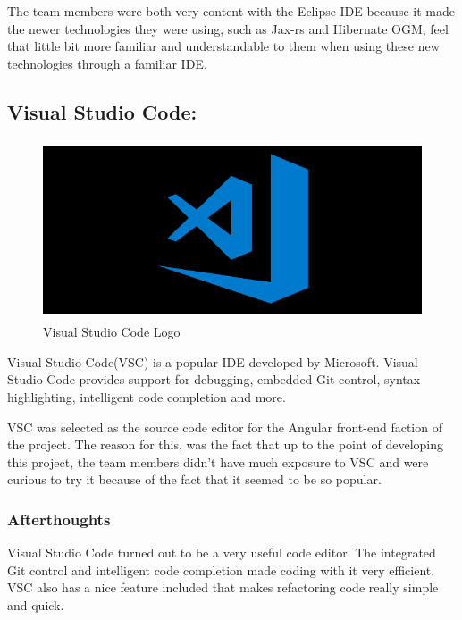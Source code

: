 The team members were both very content with the Eclipse IDE because it made the newer technologies they were using, such as Jax-rs and Hibernate OGM, feel that little bit more familiar and understandable to them when using these new technologies through a familiar IDE.


\subsection{Visual Studio Code:}
\label{sec:TechnologyReviewVSC}
\begin{figure}[H]
    \centering
    \includegraphics[width=\textwidth, height=150pt]{img/vscLogo.PNG}
    \caption{Visual Studio Code Logo}
    \label{fig:my_label}
\end{figure}

\bigskip

Visual Studio Code(VSC) is a popular IDE developed by Microsoft. Visual Studio Code provides support for debugging, embedded Git control, syntax highlighting, intelligent code completion and more.

\bigskip

VSC was selected as the source code editor for the Angular front-end faction of the project. The reason for this, was the fact that up to the point of developing this project, the team members didn't have much exposure to VSC and were curious to try it because of the fact that it seemed to be so popular. 

\subsubsection{Afterthoughts}

Visual Studio Code turned out to be a very useful code editor. The integrated Git control and intelligent code completion made coding with it very efficient. VSC also has a nice feature included that makes refactoring code really simple and quick.

